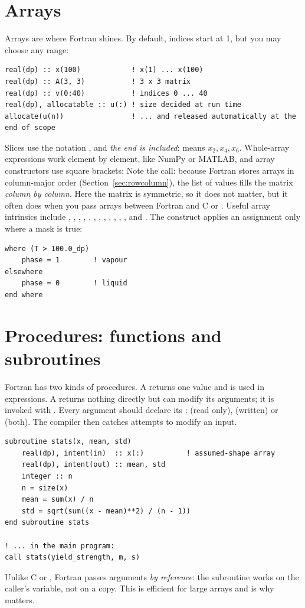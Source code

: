 \section{Arrays}

Arrays are where Fortran shines. By default, indices start at 1, but you may choose any
range:
\begin{lstlisting}[language={[08]Fortran}]
real(dp) :: x(100)            ! x(1) ... x(100)
real(dp) :: A(3, 3)           ! 3 x 3 matrix
real(dp) :: v(0:40)           ! indices 0 ... 40
real(dp), allocatable :: u(:) ! size decided at run time
allocate(u(n))                ! ... and released automatically at the end of scope
\end{lstlisting}
Slices use the notation , and \emph{the end is included}:
 means $x_2, x_4, x_6$. Whole-array expressions work element by element,
like NumPy or MATLAB, and array constructors use square brackets:
Note the  call: because Fortran stores arrays in column-major order
(Section~\ref{sec:rowcolumn}), the list of values fills the matrix \emph{column by
column}. Here the matrix is symmetric, so it does not matter, but it often does when you
pass arrays between Fortran and C or \py. Useful array intrinsics include ,
, , , , , ,
, , , , ,
 and . The  construct applies an assignment only
where a mask is true:
\begin{lstlisting}[language={[08]Fortran}]
where (T > 100.0_dp)
    phase = 1        ! vapour
elsewhere
    phase = 0        ! liquid
end where
\end{lstlisting}

\section{Procedures: functions and subroutines}

Fortran has two kinds of procedures. A  returns one value and is used in
expressions. A  returns nothing directly but can modify its arguments;
it is invoked with . Every argument should declare its :
 (read only),  (written) or  (both). The compiler then
catches attempts to modify an input.
\begin{lstlisting}[language={[08]Fortran}]
subroutine stats(x, mean, std)
    real(dp), intent(in)  :: x(:)          ! assumed-shape array
    real(dp), intent(out) :: mean, std
    integer :: n
    n = size(x)
    mean = sum(x) / n
    std = sqrt(sum((x - mean)**2) / (n - 1))
end subroutine stats

! ... in the main program:
call stats(yield_strength, m, s)
\end{lstlisting}
Unlike C or \py, Fortran passes arguments \emph{by reference}: the subroutine works on the
caller's variable, not on a copy. This is efficient for large arrays and is why
 matters.

